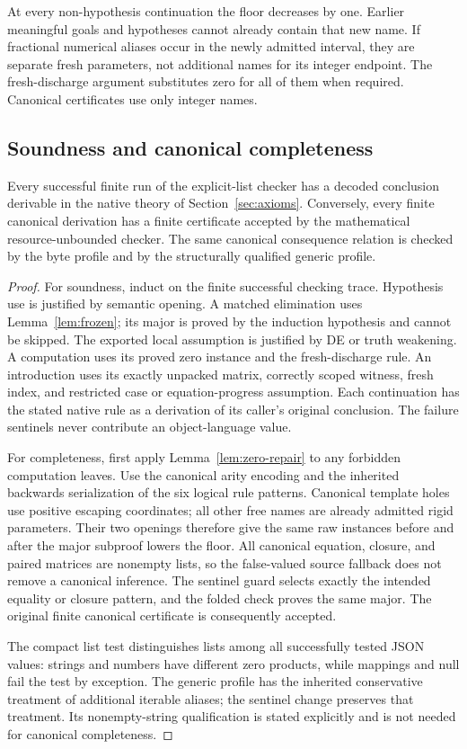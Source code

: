 At every non-hypothesis continuation the floor decreases by one. Earlier
meaningful goals and hypotheses cannot already contain that new name.
If fractional numerical aliases occur in the newly admitted interval,
they are separate fresh parameters, not additional names for its integer
endpoint. The fresh-discharge argument substitutes zero for all of them
when required. Canonical certificates use only integer names.

\subsection{Soundness and canonical completeness}

\begin{theorem}
\label{thm:correspondence}
Every successful finite run of the explicit-list checker has a decoded
conclusion derivable in the native theory of Section~\ref{sec:axioms}.
Conversely, every finite canonical derivation has a finite certificate
accepted by the mathematical resource-unbounded checker. The same
canonical consequence relation is checked by the byte profile and by
the structurally qualified generic profile.
\end{theorem}
\begin{proof}
For soundness, induct on the finite successful checking trace.
Hypothesis use is justified by semantic opening. A matched elimination
uses Lemma~\ref{lem:frozen}; its major is proved by the induction
hypothesis and cannot be skipped. The exported local assumption is
justified by DE or truth weakening. A computation uses its proved zero
instance and the fresh-discharge rule. An introduction uses its exactly
unpacked matrix, correctly scoped witness, fresh index, and restricted
case or equation-progress assumption. Each continuation has the stated
native rule as a derivation of its caller's original conclusion.
The failure sentinels never contribute an object-language value.

For completeness, first apply Lemma~\ref{lem:zero-repair} to any forbidden
computation leaves. Use the canonical arity encoding and the inherited
backwards serialization of the six logical rule patterns. Canonical
template holes use positive escaping coordinates; all other free names
are already admitted rigid parameters. Their two openings therefore
give the same raw instances before and after the major subproof lowers
the floor. All canonical equation, closure, and paired matrices are
nonempty lists, so the false-valued source fallback does not remove a
canonical inference. The sentinel guard selects exactly the intended
equality or closure pattern, and the folded check proves the same major.
The original finite canonical certificate is consequently accepted.

The compact list test distinguishes lists among all successfully tested
JSON values: strings and numbers have different zero products, while
mappings and null fail the test by exception. The generic profile has
the inherited conservative treatment of additional iterable aliases;
the sentinel change preserves that treatment. Its nonempty-string
qualification is stated explicitly and is not needed for canonical
completeness.
\end{proof}

